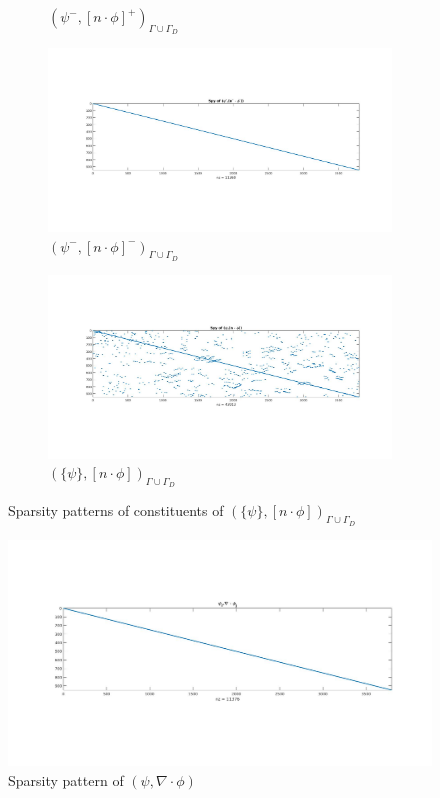\documentclass[a4paper]{book}
\begin{document}
\begin{figure}[H]
\begin{subfigure}{.5\textwidth}
  \caption{$( \psi^- ,[n \cdot \phi]^+)_{\Gamma \cup \Gamma_D}$}
  \label{fig:figure43}
\end{subfigure}
\begin{subfigure}{.5\textwidth}	
\centering
  \includegraphics[width=\linewidth]{figure44.jpg}
  \caption{$( \psi^- ,[n \cdot \phi]^-)_{\Gamma \cup \Gamma_D}$}
  \label{fig:figure44}
\end{subfigure}
\begin{subfigure}{\textwidth}	
\centering
  \includegraphics[width=\linewidth]{figure4.jpg}
  \caption{$(\lbrace \psi \rbrace ,[n \cdot \phi])_{\Gamma \cup \Gamma_D}$}
  \label{fig:figure4}
\end{subfigure}
\caption{Sparsity patterns of constituents of $(\lbrace \psi  \rbrace,[n \cdot \phi])_{\Gamma \cup \Gamma_D}$}
\label{figure_4_all}
\end{figure}
\begin{figure}[H]
\centering
  \includegraphics[width=\linewidth]{figure5.jpg}
  \caption{Sparsity pattern of $(\psi,\nabla \cdot \phi)$}
  \label{figure_5}
\end{figure}
\end{document}
